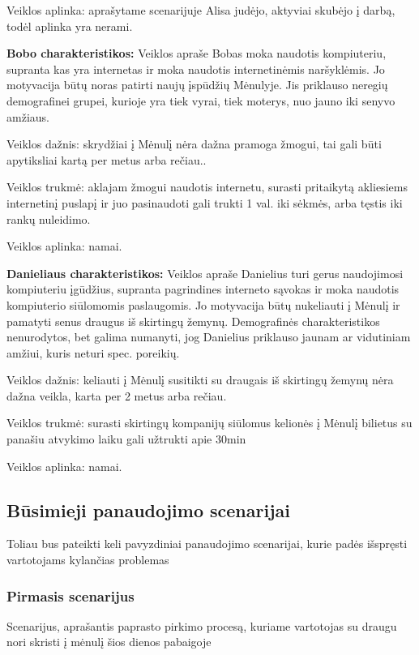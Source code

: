 \documentclass{VUMIFPSkursinis}
\begin{document}
Veiklos aplinka: aprašytame scenarijuje Alisa judėjo, aktyviai skubėjo į darbą, todėl aplinka yra nerami.

\textbf{Bobo charakteristikos: } Veiklos apraše Bobas moka naudotis kompiuteriu, supranta kas yra internetas ir moka naudotis internetinėmis naršyklėmis. Jo motyvacija būtų noras patirti naujų įspūdžių Mėnulyje. Jis priklauso neregių demografinei grupei, kurioje yra tiek vyrai, tiek moterys, nuo jauno iki senyvo amžiaus. 

Veiklos dažnis: skrydžiai į Mėnulį nėra dažna pramoga žmogui, tai gali būti apytiksliai kartą per metus arba rečiau..

Veiklos trukmė: aklajam žmogui naudotis internetu, surasti pritaikytą akliesiems internetinį puslapį ir juo pasinaudoti gali trukti 1 val. iki sėkmės, arba tęstis iki rankų nuleidimo.

Veiklos aplinka: namai.

\textbf{Danieliaus charakteristikos: } Veiklos apraše Danielius turi gerus naudojimosi kompiuteriu įgūdžius, supranta pagrindines interneto sąvokas ir moka naudotis kompiuterio siūlomomis paslaugomis. Jo motyvacija būtų nukeliauti į Mėnulį ir pamatyti senus draugus iš skirtingų žemynų. Demografinės charakteristikos nenurodytos, bet galima numanyti, jog Danielius priklauso jaunam ar vidutiniam amžiui, kuris neturi spec. poreikių.

Veiklos dažnis: keliauti į Mėnulį susitikti su draugais iš skirtingų žemynų nėra dažna veikla, karta per 2 metus arba rečiau.

Veiklos trukmė: surasti skirtingų kompanijų siūlomus kelionės į Mėnulį bilietus su panašiu atvykimo laiku gali užtrukti apie 30min

Veiklos aplinka: namai.

\subsection{Būsimieji panaudojimo scenarijai}
Toliau bus pateikti keli pavyzdiniai panaudojimo scenarijai, kurie padės išspręsti vartotojams kylančias problemas

\subsubsection{Pirmasis scenarijus}
Scenarijus, aprašantis paprasto pirkimo procesą, kuriame vartotojas su draugu nori skristi į mėnulį šios dienos pabaigoje
\end{document}
